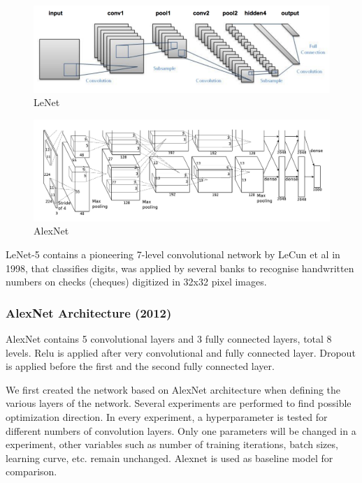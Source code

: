 \documentclass[journal,onecolumn]{IEEEtran}
\begin{document}
\begin{figure}[!t]
\includegraphics[width=0.8\paperwidth]{images/lenet}
\caption{LeNet}
\end{figure}

\begin{figure}[!t]
\includegraphics[width=0.8\paperwidth]{images/alexnet}
\caption{AlexNet}
\end{figure}

LeNet-5 contains a pioneering 7-level convolutional network by LeCun et al in 1998, that classifies digits, was applied by several banks to recognise handwritten numbers on checks (cheques) digitized in 32x32 pixel images.

\subsubsection{AlexNet Architecture (2012)}
AlexNet contains 5 convolutional layers and 3 fully connected layers, total 8 levels. Relu is applied after very convolutional and fully connected layer. Dropout is applied before the first and the second fully connected layer. 

We first created the network based on AlexNet architecture when defining the various layers of the network. Several experiments are performed to find possible optimization direction. In every experiment, a hyperparameter is tested for different numbers of convolution layers. Only one parameters will be changed in a experiment, other variables such as number of training iterations, batch sizes, learning curve, etc. remain unchanged. Alexnet is used as baseline model for comparison.
\end{document}
